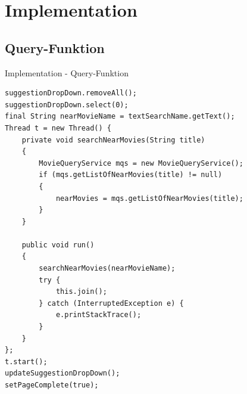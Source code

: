 \documentclass{beamer} %
\begin{document}
	\section{Implementation}
	\subsection{Query-Funktion}
	\begin{frame}[fragile]{Implementation - Query-Funktion}
		\tiny\begin{lstlisting}
suggestionDropDown.removeAll();
suggestionDropDown.select(0);
final String nearMovieName = textSearchName.getText(); 
Thread t = new Thread() {
    private void searchNearMovies(String title)
    {
        MovieQueryService mqs = new MovieQueryService();
        if (mqs.getListOfNearMovies(title) != null)
        {
            nearMovies = mqs.getListOfNearMovies(title);
        }
    }
    
    public void run()
    {
        searchNearMovies(nearMovieName);
        try {
            this.join();
        } catch (InterruptedException e) {
            e.printStackTrace();
        }
    }
};
t.start();
updateSuggestionDropDown();
setPageComplete(true);
		\end{lstlisting}
	\end{frame}

	\section{}
	\begin{frame}
	\end{frame}
\end{document}
